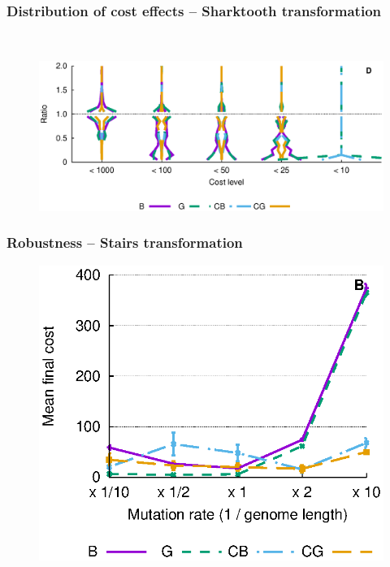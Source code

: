 \documentclass{beamer}
\theoremstyle{plain}
\theoremstyle{definition}
\begin{document}
\begin{frame}
   \frametitle{Distribution of cost effects -- Sharktooth transformation}
   \vspace{2.5cm}
   \hspace{-4cm}~\begin{figure}
      \hspace{-4.5em}
      \includegraphics[trim=0 4cm 0 0,scale=.65]{hard_sinusoidal_histo}
      \hspace{-4em}
   \end{figure}
   \vspace{-3.5cm}
\end{frame}
\begin{frame}
   \frametitle{Robustness -- Stairs transformation}
   \vspace{3cm}
   \begin{figure}
      \includegraphics[trim=0 4.2cm 0 0,scale=.7]{pres_mutrates_b}
   \end{figure}
   \vspace{-4.5cm}
\end{frame}
\end{document}
